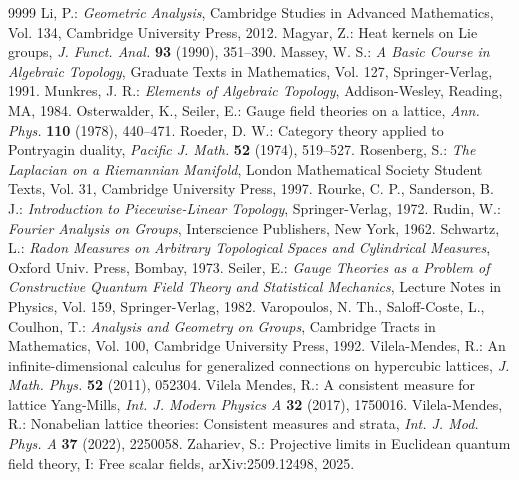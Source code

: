 \documentclass[11pt,reqno]{amsart}
\numberwithin{equation}{section}
\theoremstyle{remark}
\theoremstyle{rmdefinition}
\begin{document}
\begin{thebibliography}{9999}
 Li, P.: {\em Geometric Analysis}, Cambridge Studies in Advanced Mathematics, Vol. 134, Cambridge University Press, 2012.
 Magyar, Z.: Heat kernels on Lie groups, {\em J. Funct. Anal.} {\bf 93} (1990), 351–390.
 Massey, W. S.: {\em A Basic Course in Algebraic Topology}, Graduate Texts in Mathematics, Vol. 127, Springer-Verlag, 1991.
 Munkres, J. R.: {\em Elements of Algebraic Topology}, Addison-Wesley, Reading, MA, 1984.
 Osterwalder, K., Seiler, E.: Gauge field theories on a lattice, {\em Ann. Phys.} {\bf 110} (1978), 440–471.
 Roeder, D. W.: Category theory applied to Pontryagin duality, {\em Pacific J. Math.} {\bf 52} (1974), 519--527.
 Rosenberg, S.: {\em The Laplacian on a Riemannian Manifold}, London Mathematical Society Student Texts, Vol. 31, Cambridge University Press, 1997.
 Rourke, C. P., Sanderson, B. J.: {\em Introduction to Piecewise-Linear Topology}, Springer-Verlag, 1972.
 Rudin, W.: {\em Fourier Analysis on Groups}, Interscience Publishers, New York, 1962.
 Schwartz, L.: {\em Radon Measures on Arbitrary Topological Spaces and Cylindrical Measures}, Oxford Univ. Press, Bombay, 1973.
 Seiler, E.: {\em Gauge Theories as a Problem of Constructive Quantum Field Theory and Statistical Mechanics}, Lecture Notes in Physics, Vol. 159, Springer-Verlag, 1982.
 Varopoulos, N. Th., Saloff-Coste, L., Coulhon, T.: {\em Analysis and Geometry on Groups}, Cambridge Tracts in Mathematics, Vol. 100, Cambridge University Press, 1992.
 Vilela-Mendes, R.: An infinite-dimensional calculus for generalized connections on hypercubic lattices, {\em J. Math. Phys.} {\bf 52} (2011), 052304.
 Vilela Mendes, R.: A consistent measure for lattice Yang-Mills, {\em Int. J. Modern Physics A} {\bf 32} (2017), 1750016.
 Vilela-Mendes, R.: Nonabelian lattice theories: Consistent measures and strata, {\em Int. J. Mod. Phys. A} {\bf 37} (2022), 2250058.
 Zahariev, S.: Projective limits in Euclidean quantum field theory, I: Free scalar fields, arXiv:2509.12498, 2025.

\end{thebibliography}
\end{document}
